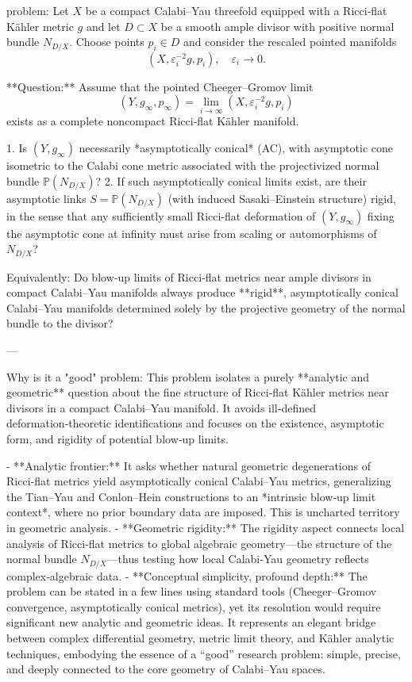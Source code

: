 problem:  
Let \( X \) be a compact Calabi–Yau threefold equipped with a Ricci‑flat Kähler metric \( g \) and let \( D \subset X \) be a smooth ample divisor with positive normal bundle \( N_{D/X} \).  
Choose points \(p_i \in D\) and consider the rescaled pointed manifolds  
\[
(X, \varepsilon_i^{-2} g, p_i), \quad \varepsilon_i \to 0.
\]

**Question:**  
Assume that the pointed Cheeger–Gromov limit
\[
(Y, g_\infty, p_\infty) = \lim_{i \to \infty} (X, \varepsilon_i^{-2} g, p_i)
\]
exists as a complete noncompact Ricci‑flat Kähler manifold.  

1. Is \( (Y, g_\infty) \) necessarily *asymptotically conical* (AC), with asymptotic cone isometric to the Calabi cone metric associated with the projectivized normal bundle \( \mathbb{P}(N_{D/X}) \)?  
2. If such asymptotically conical limits exist, are their asymptotic links \(S = \mathbb{P}(N_{D/X})\) (with induced Sasaki–Einstein structure) rigid, in the sense that any sufficiently small Ricci‑flat deformation of \( (Y, g_\infty) \) fixing the asymptotic cone at infinity must arise from scaling or automorphisms of \(N_{D/X}\)?  

Equivalently: Do blow‑up limits of Ricci‑flat metrics near ample divisors in compact Calabi–Yau manifolds always produce **rigid**, asymptotically conical Calabi–Yau manifolds determined solely by the projective geometry of the normal bundle to the divisor?

---

Why is it a "good" problem:  
This problem isolates a purely **analytic and geometric** question about the fine structure of Ricci‑flat Kähler metrics near divisors in a compact Calabi–Yau manifold. It avoids ill‑defined deformation‑theoretic identifications and focuses on the existence, asymptotic form, and rigidity of potential blow‑up limits.

- **Analytic frontier:** It asks whether natural geometric degenerations of Ricci‑flat metrics yield asymptotically conical Calabi–Yau metrics, generalizing the Tian–Yau and Conlon–Hein constructions to an *intrinsic blow‑up limit context*, where no prior boundary data are imposed. This is uncharted territory in geometric analysis.  
- **Geometric rigidity:** The rigidity aspect connects local analysis of Ricci‑flat metrics to global algebraic geometry—the structure of the normal bundle \(N_{D/X}\)—thus testing how local Calabi‑Yau geometry reflects complex‑algebraic data.  
- **Conceptual simplicity, profound depth:** The problem can be stated in a few lines using standard tools (Cheeger–Gromov convergence, asymptotically conical metrics), yet its resolution would require significant new analytic and geometric ideas. It represents an elegant bridge between complex differential geometry, metric limit theory, and Kähler analytic techniques, embodying the essence of a “good” research problem: simple, precise, and deeply connected to the core geometry of Calabi–Yau spaces.